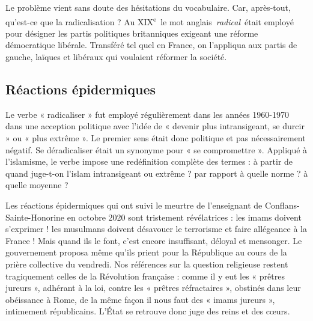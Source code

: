 Le problème vient sans doute des hésitations du vocabulaire. Car,
après-tout, qu'est-ce que la radicalisation ? Au
XIX\textsuperscript{e}~le mot anglais~\emph{radical}~était employé pour
désigner les partis politiques britanniques exigeant une réforme
démocratique libérale. Transféré tel quel en France, on l'appliqua aux
partis de gauche, laïques et libéraux qui voulaient réformer la société.

\subsection{Réactions épidermiques}

Le verbe « radicaliser » fut employé régulièrement dans les années
1960-1970 dans une acception politique avec l'idée de « devenir plus
intransigeant, se durcir » ou « plus extrême ». Le premier sens était
donc politique et pas nécessairement négatif. Se déradicaliser était un
synonyme pour « se compromettre ». Appliqué à l'islamisme, le verbe
impose une redéfinition complète des termes : à partir de quand
juge-t-on l'islam intransigeant ou extrême ? par rapport à quelle norme
? à quelle moyenne ?

Les réactions épidermiques qui ont suivi le meurtre de l'enseignant de
Conflans-Sainte-Honorine en octobre 2020 sont tristement révélatrices :
les imams doivent s'exprimer ! les musulmans doivent désavouer le
terrorisme et faire allégeance à la France ! Mais quand ils le font,
c'est encore insuffisant, déloyal et mensonger. Le gouvernement proposa
même qu'ils prient pour la République au cours de la prière collective
du vendredi. Nos références sur la question religieuse restent
tragiquement celles de la Révolution française : comme il y eut les «
prêtres jureurs », adhérant à la loi, contre les « prêtres réfractaires
», obstinés dans leur obéissance à Rome, de la même façon il nous faut
des « imams jureurs », intimement républicains. L'État se retrouve donc
juge des reins et des cœurs.
